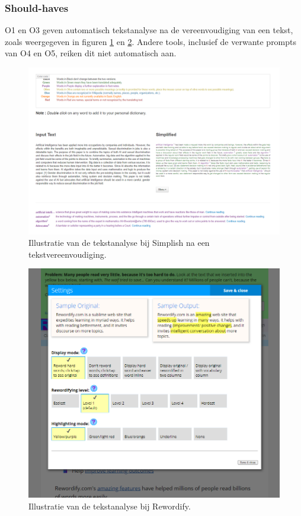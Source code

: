\subsubsection{Should-haves}

O1 en O3 geven automatisch tekstanalyse na de vereenvoudiging van een tekst, zoals weergegeven in figuren \ref{img:simplish-output} en \ref{img:scholarcy}. Andere tools, inclusief de verwante prompts van O4 en O5, reiken dit niet automatisch aan. 

\begin{figure}[H]
	\includegraphics[width=\linewidth]{img/simplish-output.png}
	\caption{Illustratie van de tekstanalyse bij Simplish na een tekstvereenvoudiging.}
	\label{img:simplish-output}
\end{figure}

\begin{figure}[H]
	\includegraphics[width=\linewidth]{img/scholarcy-attempt.png}
	\caption{Illustratie van de tekstanalyse bij Rewordify.}
	\label{img:scholarcy}
\end{figure}

